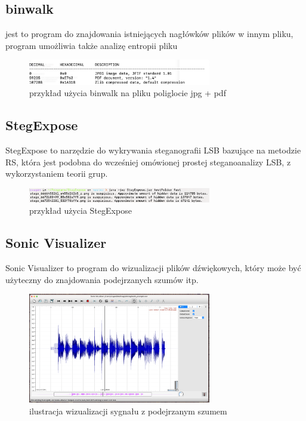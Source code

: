 \documentclass{article}
\begin{document}
\subsection{binwalk}
jest to program do znajdowania istniejących nagłówków plików w innym pliku, program umożliwia także analizę entropii pliku
\begin{figure}[H]
	\centering
	\includegraphics[width=8cm]{binwalk}
	\caption{przykład użycia binwalk na pliku poliglocie jpg + pdf}
\end{figure}
\subsection{StegExpose}
StegExpose to narzędzie do wykrywania steganografii LSB bazujące na metodzie RS,  która jest podobna
do wcześniej omówionej prostej steganoanalizy LSB, z wykorzystaniem teorii grup.
\begin{figure}[H]
	\centering
	\includegraphics[width=8cm]{stegexpose}
	\caption{przykład użycia StegExpose}
\end{figure}
\subsection{Sonic Visualizer}
Sonic Visualizer to program do wizualizacji plików dźwiękowych, który może być użyteczny do znajdowania
podejrzanych szumów itp.
\begin{figure}[H]
	\centering
	\includegraphics[width=8cm]{sonic}
	\caption{ilustracja wizualizacji sygnału z podejrzanym szumem}
\end{figure}
\end{document}

